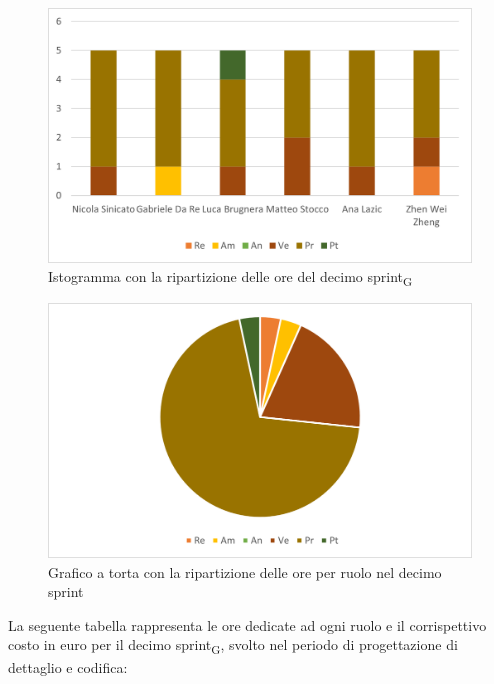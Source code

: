 \begin{figure}[H]
	\centering
	\includegraphics[scale=0.6]{img/grafi preventivo/istogrammi/codifica/sprint10.png}
	\caption{Istogramma con la ripartizione delle ore del decimo sprint\textsubscript{G}}
\end{figure}
\begin{figure}[H]
	\centering
	\includegraphics[scale=0.6]{img/grafi preventivo/torta/codifica/sprint10.png}
	\caption{Grafico a torta con la ripartizione delle ore per ruolo nel decimo sprint}
\end{figure}
La seguente tabella rappresenta le ore dedicate ad ogni ruolo e il corrispettivo costo in euro per il decimo sprint\textsubscript{G}, svolto nel periodo di progettazione di dettaglio e codifica: 

